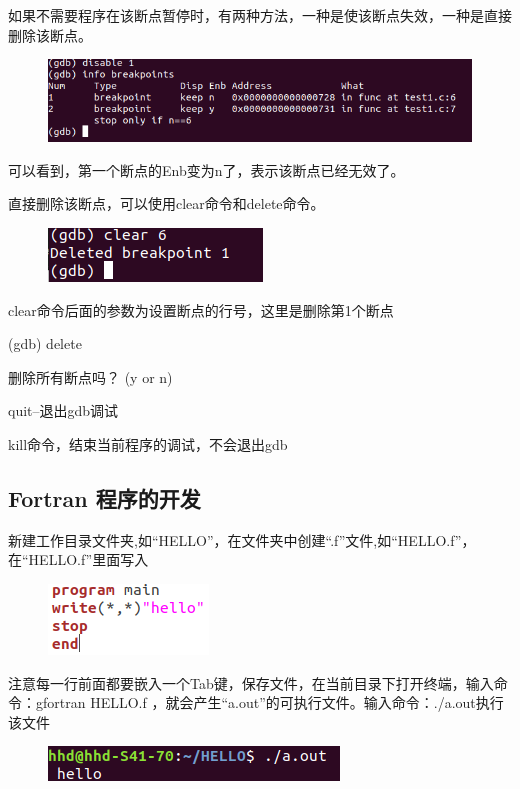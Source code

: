 \documentclass[12pt,a4paper]{article}
\begin{document}
如果不需要程序在该断点暂停时，有两种方法，一种是使该断点失效，一种是直接删除该断点。
\begin{figure}[H]
\centering
\includegraphics[scale=0.5]{./figures/28.png}
\caption{}
\end{figure}
可以看到，第一个断点的Enb变为n了，表示该断点已经无效了。

直接删除该断点，可以使用clear命令和delete命令。
\begin{figure}[H]
\centering
\includegraphics[scale=0.5]{./figures/29.png}
\caption{}
\end{figure}
clear命令后面的参数为设置断点的行号，这里是删除第1个断点

(gdb) delete

删除所有断点吗？ (y or n) 

quit--退出gdb调试

kill命令，结束当前程序的调试，不会退出gdb

\subsection{ Fortran 程序的开发 }
新建工作目录文件夹,如“HELLO”，在文件夹中创建“.f”文件,如“HELLO.f”，在“HELLO.f”里面写入
\begin{figure}[H]
\centering
\includegraphics[scale=0.5]{./figures/30.png}
\caption{}
\end{figure}
注意每一行前面都要嵌入一个Tab键，保存文件，在当前目录下打开终端，输入命令：gfortran HELLO.f ，就会产生“a.out”的可执行文件。输入命令：./a.out执行该文件
\begin{figure}[H]
\centering
\includegraphics[scale=0.5]{./figures/31.png}
\caption{}
\end{figure}
\end{document}
